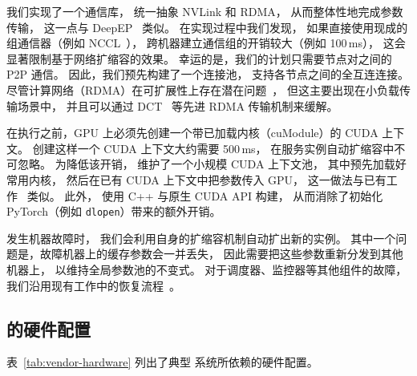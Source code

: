 我们实现了一个通信库，
统一抽象 NVLink 和 RDMA，
从而整体性地完成参数传输，
这一点与 DeepEP~\cite{deepep} 类似。
在实现过程中我们发现，
如果直接使用现成的组通信器（例如 NCCL~\cite{nccl}），
跨机器建立通信组的开销较大（例如 100\,ms），
这会显著限制基于网络扩缩容的效果。
幸运的是，我们的计划只需要节点对之间的 P2P 通信。
因此，我们预先构建了一个连接池，
支持各节点之间的全互连连接。
尽管计算网络（RDMA）在可扩展性上存在潜在问题~\cite{fasst}，
但这主要出现在小负载传输场景中，
并且可以通过 DCT~\cite{krcore} 等先进 RDMA 传输机制来缓解。

在执行之前，GPU 上必须先创建一个带已加载内核（cuModule）的 CUDA 上下文。
创建这样一个 CUDA 上下文大约需要 500\,ms，
在服务实例自动扩缩容中不可忽略。
为降低该开销，{\sys} 维护了一个小规模 CUDA 上下文池，
其中预先加载好常用内核，
然后在已有 CUDA 上下文中把参数传入 GPU，
这一做法与已有工作~\cite{DBLP:journals/corr/abs-2405-12079} 类似。
此外，{\sys} 使用 C++ 与原生 CUDA API 构建，
从而消除了初始化 PyTorch（例如 \texttt{dlopen}）带来的额外开销。

发生机器故障时，
我们会利用自身的扩缩容机制自动扩出新的实例。
其中一个问题是，故障机器上的缓存参数会一并丢失，
因此需要把这些参数重新分发到其他机器上，
以维持全局参数池的不变式。
对于调度器、监控器等其他组件的故障，
我们沿用现有工作中的恢复流程~\cite{DBLP:conf/usenix/Romero0YK21,DBLP:journals/corr/abs-2401-14351}。

\subsection{{\maas} 的硬件配置}
\label{sec:appendix-hardware}

\noindent
表~\ref{tab:vendor-hardware} 列出了典型 {\maas} 系统所依赖的硬件配置。
